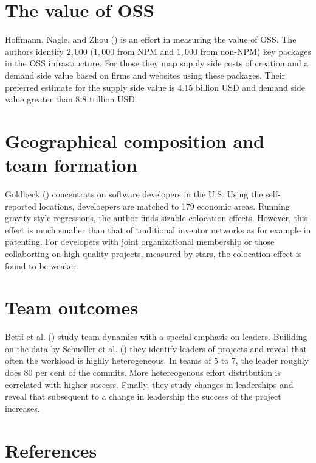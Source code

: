\documentclass[
  12pt,
]{article}
\begin{document}
\section{The value of OSS}\label{sec-value}

Hoffmann, Nagle, and Zhou () is an
effort in measuring the value of OSS. The authors identify \(2,000\)
(\(1,000\) from NPM and \(1,000\) from non-NPM) key packages in the OSS
infrastructure. For those they map supply side costs of creation and a
demand side value based on firms and websites using these packages.
Their preferred estimate for the supply side value is \(4.15\) billion
USD and demand side value greater than \(8.8\) trillion USD.

\section{Geographical composition and team formation}\label{sec-teams}

Goldbeck () concentrats on software
developers in the U.S. Using the self-reported locations, develoepers
are matched to 179 economic areas. Running gravity-style regressions,
the author finds sizable colocation effects. However, this effect is
much smaller than that of traditional inventor networks as for example
in patenting. For developers with joint organizational membership or
those collaborting on high quality projects, measured by stars, the
colocation effect is found to be weaker.

\section{Team outcomes}\label{sec-outcomes}

Betti et al. () study team
dynamics with a special emphasis on leaders. Builiding on the data by
Schueller et al. () they identify
leaders of projects and reveal that often the workload is highly
heterogeneous. In teams of \(5\) to \(7\), the leader roughly does
\(80\) per cent of the commits. More hetereogenous effort distribution
is correlated with higher success. Finally, they study changes in
leaderships and reveal that subsequent to a change in leadership the
success of the project increases.

\section{References}\label{sec-references}
\end{document}
